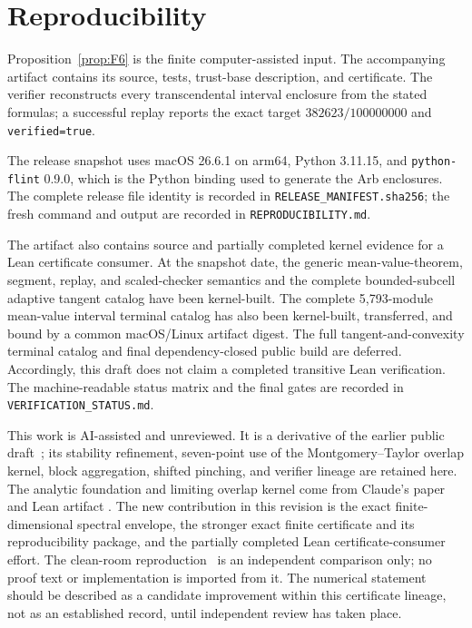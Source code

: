 \documentclass[11pt]{article}
\begin{document}
\clearpage
\section*{Reproducibility}

Proposition~\ref{prop:F6} is the finite computer-assisted input.  The
accompanying artifact contains its source, tests, trust-base description,
and certificate.  The verifier reconstructs every transcendental interval
enclosure from the stated formulas; a successful replay reports the exact
target $382623/100000000$ and \texttt{verified=true}.

The release snapshot uses macOS 26.6.1 on arm64, Python 3.11.15, and
\texttt{python-flint} 0.9.0, which is the Python binding used to generate the
Arb enclosures.  The complete release file identity is recorded in
\texttt{RELEASE\_MANIFEST.sha256}; the fresh command and output are recorded
in \texttt{REPRODUCIBILITY.md}.

The artifact also contains source and partially completed kernel evidence for
a Lean certificate consumer.  At the snapshot date, the generic
mean-value-theorem, segment, replay, and scaled-checker semantics and the
complete bounded-subcell adaptive tangent catalog have been kernel-built.
The complete 5,793-module mean-value interval terminal catalog has also been
kernel-built, transferred, and bound by a common macOS/Linux artifact digest.
The full tangent-and-convexity terminal catalog and final dependency-closed
public build are deferred.
Accordingly, this draft does not claim a completed transitive Lean
verification.  The machine-readable status matrix and the final gates are
recorded in \texttt{VERIFICATION\_STATUS.md}.

This work is AI-assisted and unreviewed.  It is a derivative of the earlier
public draft~\cite{Ainta26}; its stability refinement, seven-point use of the
Montgomery--Taylor overlap kernel, block aggregation, shifted pinching, and
verifier lineage are retained here.  The analytic foundation and limiting
overlap kernel come from Claude's paper and Lean artifact
\cite{Claude26,AnthropicLean26}.  The new contribution in this revision is the
exact finite-dimensional spectral envelope, the stronger exact finite
certificate and its reproducibility package, and the partially completed Lean
certificate-consumer effort.  The clean-room
reproduction~\cite{Learademacher26} is an independent comparison only; no
proof text or implementation is imported from it.
The numerical statement should be described as a candidate improvement within
this certificate lineage, not as an established record, until independent
review has taken place.
\end{document}
